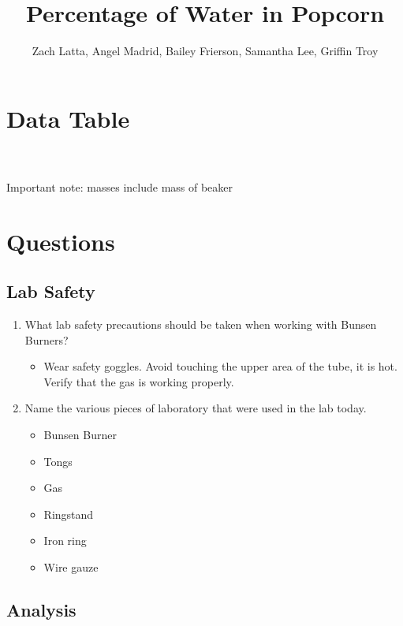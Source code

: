 \documentclass[12pt]{article}
\title{Percentage of Water in Popcorn}
\author{Zach Latta, Angel Madrid, Bailey Frierson, Samantha Lee, Griffin Troy}
\begin{document}
\maketitle

\section{Data Table}

\\\\
Important note: masses include mass of beaker

\section{Questions}

\subsection{Lab Safety}

\begin{enumerate}
  \item What lab safety precautions should be taken when working with Bunsen Burners?
    \begin{itemize}
      \item Wear safety goggles. Avoid touching the upper area of the tube, it
        is hot. Verify that the gas is working properly.
    \end{itemize}
  \item Name the various pieces of laboratory that were used in the lab today.
    \begin{itemize}
      \item Bunsen Burner
      \item Tongs
      \item Gas
      \item Ringstand
      \item Iron ring
      \item Wire gauze
    \end{itemize}
\end{enumerate}

\subsection{Analysis}
\end{document}
